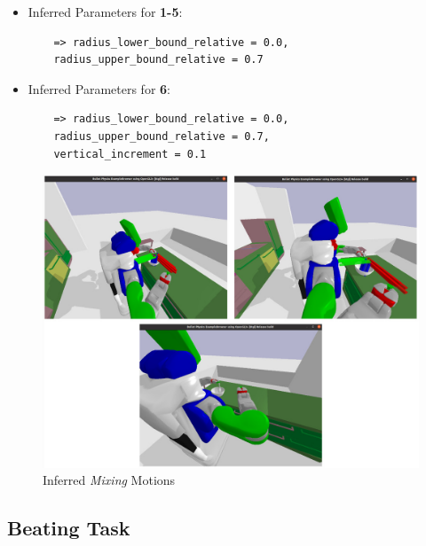 \begin{itemize}
  \item Inferred Parameters for \textbf{1-5}: 
   \begin{lstlisting}
    => radius_lower_bound_relative = 0.0, 
    radius_upper_bound_relative = 0.7
  \end{lstlisting}
  \item Inferred Parameters for \textbf{6}:
  \begin{lstlisting}
    => radius_lower_bound_relative = 0.0, 
    radius_upper_bound_relative = 0.7,
    vertical_increment = 0.1
  \end{lstlisting}
\end{itemize}

\begin{figure}[H]
  \includegraphics[scale=0.35]{Graphics/mixing_evaluation.jpg}
  \caption{Inferred \textit{Mixing} Motions}
  \label{fig:mixingverb WikiHow}
\end{figure}

\subsection{Beating Task}

